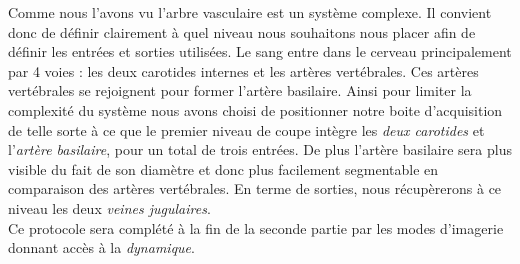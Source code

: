 Comme nous l’avons vu l’arbre vasculaire est un système complexe. Il convient donc de définir clairement à quel niveau nous souhaitons nous placer afin de définir les entrées et sorties utilisées. Le sang entre dans le cerveau principalement par 4 voies : les deux carotides internes et les artères vertébrales. Ces artères vertébrales se rejoignent pour former l’artère basilaire. Ainsi pour limiter la complexité du système nous avons choisi de positionner notre boite d’acquisition de telle sorte à ce que le premier niveau de coupe intègre les {\em deux carotides} et l’{\em artère basilaire}, pour un total de trois entrées. De plus l’artère basilaire sera plus visible du fait de son diamètre et donc plus facilement segmentable en comparaison des artères vertébrales. En terme de sorties, nous récupèrerons à ce niveau les deux {\em veines jugulaires}.\\
Ce protocole sera complété à la fin de la seconde partie par les modes d’imagerie donnant accès à la {\em dynamique}.





			
		
{}
